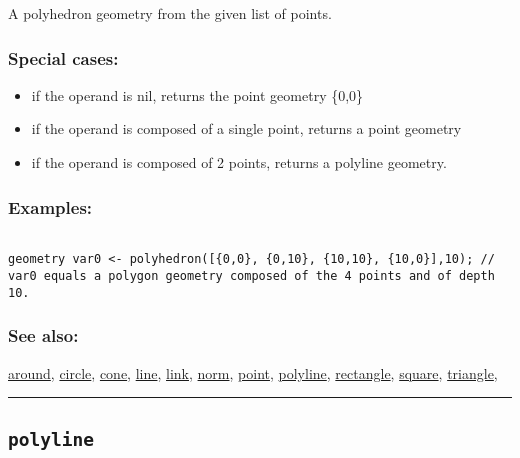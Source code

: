 \documentclass[]{book}
\providecommand{\tightlist}{%
  \setlength{\itemsep}{0pt}\setlength{\parskip}{0pt}}
\theoremstyle{definition}
\theoremstyle{definition}
\theoremstyle{definition}
\theoremstyle{remark}
\begin{document}
A polyhedron geometry from the given list of points.

\subsubsection{Special cases:}\label{special-cases-112}

\begin{itemize}
\tightlist
\item
  if the operand is nil, returns the point geometry \{0,0\}\\
\item
  if the operand is composed of a single point, returns a point
  geometry\\
\item
  if the operand is composed of 2 points, returns a polyline geometry.
\end{itemize}

\subsubsection{Examples:}\label{examples-288}

\begin{verbatim}
 
geometry var0 <- polyhedron([{0,0}, {0,10}, {10,10}, {10,0}],10); // var0 equals a polygon geometry composed of the 4 points and of depth 10.
\end{verbatim}

\subsubsection{See also:}\label{see-also-167}

\href{operators-a-to-a.html\#around}{around},
\href{operators-b-to-c.html\#circle}{circle},
\href{operators-b-to-c.html\#cone}{cone},
\href{operators-i-to-m.html\#line}{line},
\href{operators-i-to-m.html\#link}{link},
\href{operators-n-to-r.html\#norm}{norm},
\href{operators-n-to-r.html\#point}{point},
\href{operators-n-to-r.html\#polyline}{polyline},
\href{operators-n-to-r.html\#rectangle}{rectangle},
\href{operators-s-to-z.html\#square}{square},
\href{operators-s-to-z.html\#triangle}{triangle},

\begin{center}\rule{0.5\linewidth}{\linethickness}\end{center}

\subsection{\texorpdfstring{\texttt{polyline}}{polyline}}\label{polyline}
\end{document}
